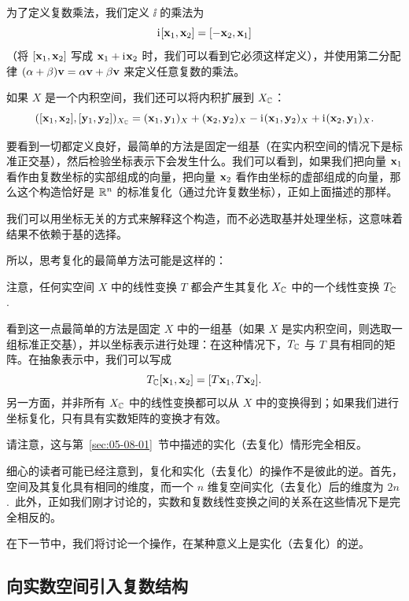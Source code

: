 为了定义复数乘法，我们定义 $\ii$ 的乘法为
$$\mathrm{i}\mkern1mu[\mathbf{x}_1, \mathbf{x}_2] = [-\mathbf{x}_2, \mathbf{x}_1]$$
（将 $[\mathbf{x}_1, \mathbf{x}_2]$ 写成 $\mathbf{x}_1 + \mathrm{i}\mkern1mu \mathbf{x}_2$ 时，我们可以看到它必须这样定义），并使用第二分配律 $(\alpha + \beta )\mathbf{v} = \alpha \mathbf{v} + \beta \mathbf{v}$ 来定义任意复数的乘法。

如果 $X$ 是一个内积空间，我们还可以将内积扩展到 $X_{\mathbb{C}}$：
$$([\mathbf{x}_1, \mathbf{x}_2], [\mathbf{y}_1, \mathbf{y}_2])_{X_{\mathbb{C}}} = (\mathbf{x}_1, \mathbf{y}_1)_X + (\mathbf{x}_2, \mathbf{y}_2)_X - \mathrm{i}\mkern1mu (\mathbf{x}_1, \mathbf{y}_2)_X + \mathrm{i}\mkern1mu(\mathbf{x}_2, \mathbf{y}_1)_X.$$

要看到一切都定义良好，最简单的方法是固定一组基（在实内积空间的情况下是标准正交基），然后检验坐标表示下会发生什么。我们可以看到，如果我们把向量 $\mathbf{x}_1$ 看作由复数坐标的实部组成的向量，把向量 $\mathbf{x}_2$ 看作由坐标的虚部组成的向量，那么这个构造恰好是 $\mathbb{R}^n$ 的标准复化（通过允许复数坐标），正如上面描述的那样。

我们可以用坐标无关的方式来解释这个构造，而不必选取基并处理坐标，这意味着结果不依赖于基的选择。

所以，思考复化的最简单方法可能是这样的：


注意，任何实空间 $X$ 中的线性变换 $T$ 都会产生其复化 $X_{\mathbb{C}}$ 中的一个线性变换 $T_{\mathbb{C}}$.~

看到这一点最简单的方法是固定 $X$ 中的一组基（如果 $X$ 是实内积空间，则选取一组标准正交基），并以坐标表示进行处理：在这种情况下，$T_{\mathbb{C}}$ 与 $T$ 具有相同的矩阵。在抽象表示中，我们可以写成
$$T_{\mathbb{C}}[\mathbf{x}_1, \mathbf{x}_2] = [T\mathbf{x}_1, T\mathbf{x}_2].$$
另一方面，并非所有 $X_{\mathbb{C}}$ 中的线性变换都可以从 $X$ 中的变换得到；如果我们进行坐标复化，只有具有实数矩阵的变换才有效。

请注意，这与第~\ref{sec:05-08-01}~节中描述的实化（去复化）情形完全相反。

细心的读者可能已经注意到，复化和实化（去复化）的操作不是彼此的逆。首先，空间及其复化具有相同的维度，而一个 $n$ 维复空间实化（去复化）后的维度为 $2n$.~此外，正如我们刚才讨论的，实数和复数线性变换之间的关系在这些情况下是完全相反的。

在下一节中，我们将讨论一个操作，在某种意义上是实化（去复化）的逆。

\subsection{向实数空间引入复数结构}\label{sec:05-08-03}

